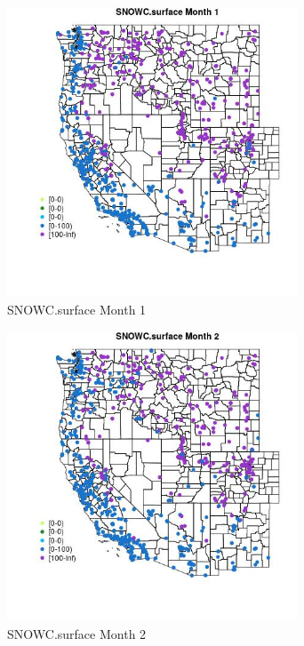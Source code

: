 \begin{figure} 
\centering  
\includegraphics[width=0.77\textwidth]{Code_Outputs/Report_ML_input_PM25_Step4_part_f_de_duplicated_aves_prioritize_24hr_obswNAs_MapObsMo1SNOWCsurface.jpg} 
\caption{\label{fig:Report_ML_input_PM25_Step4_part_f_de_duplicated_aves_prioritize_24hr_obswNAsMapObsMo1SNOWCsurface}SNOWC.surface Month 1} 
\end{figure} 
 

\begin{figure} 
\centering  
\includegraphics[width=0.77\textwidth]{Code_Outputs/Report_ML_input_PM25_Step4_part_f_de_duplicated_aves_prioritize_24hr_obswNAs_MapObsMo2SNOWCsurface.jpg} 
\caption{\label{fig:Report_ML_input_PM25_Step4_part_f_de_duplicated_aves_prioritize_24hr_obswNAsMapObsMo2SNOWCsurface}SNOWC.surface Month 2} 
\end{figure} 
 

